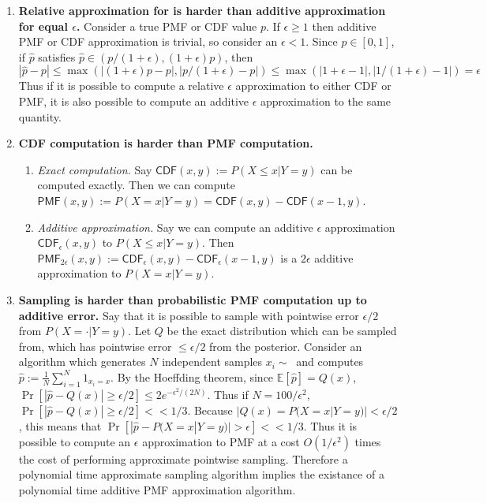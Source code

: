 \documentclass{article}
\theoremstyle{definition}
\theoremstyle{remark}
\begin{document}
\begin{enumerate}
    \item \textbf{Relative approximation for is harder than additive approximation for equal $\epsilon$.}
    Consider a true PMF or CDF value $p$. If $\epsilon \geq 1$ then additive PMF or CDF approximation is trivial, so consider an $\epsilon < 1$.
    Since $p \in [0, 1]$, if $\hat{p}$ satisfies $\hat{p} \in (p/(1+\epsilon), (1+\epsilon)p)$, then $$|\hat{p} - p| \leq \max(|(1 + \epsilon)p - p|, |p/(1+\epsilon) - p|) \leq \max(|1 + \epsilon - 1|, |1/(1+\epsilon) - 1|) = \epsilon$$
    Thus if it is possible to compute a relative $\epsilon$ approximation to either CDF or PMF, it is also possible to compute an additive $\epsilon$ approximation to the same quantity.

    \item \textbf{CDF computation is harder than PMF computation.} 
        \begin{enumerate}
            \item \textit{Exact computation.} Say $\mathsf{CDF}(x, y) := P(X \leq x | Y = y)$ can be computed exactly.  Then we can compute $\mathsf{PMF}(x, y) := P(X = x | Y = y) = \mathsf{CDF}(x, y) - \mathsf{CDF}(x - 1, y)$.
            \item \textit{Additive approximation.} Say we can compute an additive $\epsilon$ approximation $\mathsf{CDF}_\epsilon(x, y)$ to $P(X \leq x | Y = y)$. Then $\mathsf{PMF}_{2\epsilon}(x, y) := \mathsf{CDF}_\epsilon(x, y) - \mathsf{CDF}_\epsilon(x-1, y)$ is a $2\epsilon$ additive approximation to $P(X = x | Y = y)$.
        \end{enumerate}
    \item \textbf{Sampling is harder than probabilistic PMF computation up to additive error.} Say that it is possible to sample with pointwise error $\epsilon / 2$ from $P(X = \cdot | Y = y)$. Let $Q$ be the exact distribution which can be sampled from, which has pointwise error $\leq \epsilon / 2$ from the posterior.  Consider an algorithm which generates $N$ independent samples $x_i \sim ~$ and computes $\hat{p} := \frac{1}{N} \sum_{i=1}^N 1_{x_i = x}$.
    By the Hoeffding theorem, since $\mathbb{E}[\hat{p}] = Q(x)$, $\Pr[|\hat{p} - Q(x)| \geq \epsilon / 2] \leq 2e^{-\epsilon^2/(2N)}$. Thus if $N = 100/\epsilon^2$, $\Pr[|\hat{p} - Q(x)| \geq \epsilon / 2] << 1/3$.
    Because $|Q(x) = P(X = x | Y = y)| < \epsilon/2$, this means that
    $\Pr[|\hat{p} - P(X = x | Y = y)| > \epsilon] << 1/3$.
    Thus it is possible to compute an $\epsilon$ approximation to PMF at a cost $O(1/\epsilon^2)$ times the cost of performing approximate pointwise sampling.
    Therefore a polynomial time approximate sampling algorithm implies the existance of a polynomial time additive PMF approximation algorithm.
\end{enumerate}
\end{document}
